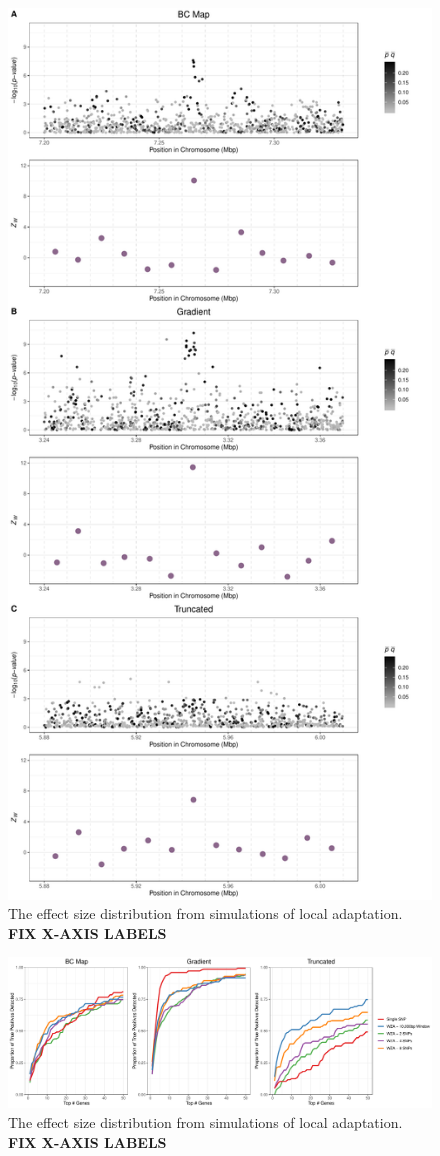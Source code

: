 \documentclass[11pt,twoside,lineno]{GSA_format}
\begin{document}
\begin{figure}[H]
  \includegraphics[height=0.9\textheight,keepaspectratio]{Plots/all_maps_plot_demo.pdf}
  \caption{The effect size distribution from simulations of local adaptation. \textbf{FIX X-AXIS LABELS}}

  \label{fig:demoPlots}
\end{figure}

\pagebreak

\begin{figure}[H]
  \includegraphics[width = \textwidth,keepaspectratio]{Plots/SNP_number.pdf}
  \caption{The effect size distribution from simulations of local adaptation. \textbf{FIX X-AXIS LABELS}}

  \label{fig:demoPlots}
\end{figure}
\end{document}
